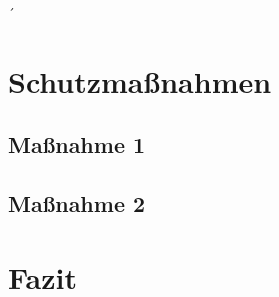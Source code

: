 ´\documentclass[
    a4paper,
    pagesize,
    pdftex,
    12pt,
]{scrartcl}
\begin{document}
    \newpage
    \section{Schutzmaßnahmen}
\subsection{Maßnahme 1}
\subsection{Maßnahme 2}

    \newpage
\section{Fazit}

    \newpage

    
    
\end{document}
